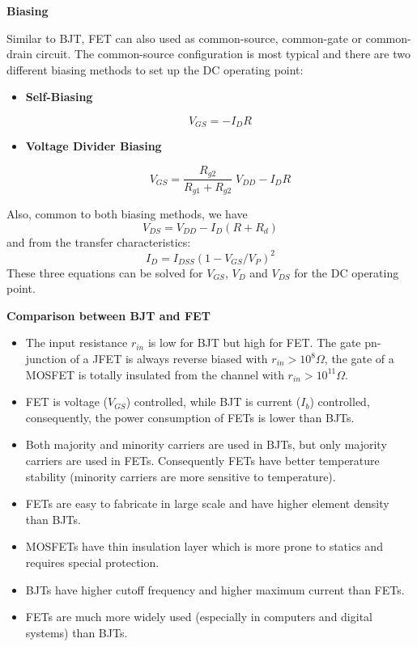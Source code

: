 

{\bf Biasing}

Similar to BJT, FET can also used as common-source, common-gate or
common-drain circuit. The common-source configuration is most typical
and there are two different biasing methods to set up the DC operating
point:
\begin{itemize}
\item {\bf Self-Biasing}

\[	V_{GS}=-I_D R	\]
\item {\bf Voltage Divider Biasing}

\[	V_{GS}=\frac{R_{g2}}{R_{g1}+R_{g2}} \;V_{DD}-I_D R \]
\end{itemize}
Also, common to both biasing methods, we have
\[	V_{DS}=V_{DD}-I_D(R+R_d)	\]
and from the transfer characteristics:
\[	I_D=I_{DSS}(1-V_{GS}/V_P)^2	\]
These three equations can be solved for $V_{GS}$, $V_D$ and $V_{DS}$
for the DC operating point. 


{\bf Comparison between BJT and FET}

\begin{itemize}
\item The input resistance $r_{in}$ is low for BJT but high for FET.
	The gate pn-junction of a JFET is always reverse biased with
	$r_{in}>10^8 \Omega$, the gate of a MOSFET is totally insulated
	from the channel with $r_{in}>10^{11} \Omega$.
\item FET is voltage ($V_{GS}$) controlled, while BJT is current ($I_b$) 
	controlled, consequently, the power consumption of FETs is lower
	than BJTs.
\item Both majority and minority carriers are used in BJTs, but only 
	majority carriers are used in FETs. Consequently FETs have better
	temperature stability (minority carriers are more sensitive to
	temperature).
\item FETs are easy to fabricate in large scale and have higher element
	density than BJTs.
\item MOSFETs have thin insulation layer which is more prone to statics
	and requires special protection. 
\item BJTs have higher cutoff frequency and higher maximum current than 
	FETs.
\item FETs are much more widely used (especially in computers and digital 
	systems) than BJTs.
\end{itemize}

